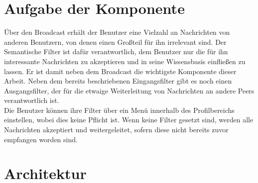\section{Aufgabe der Komponente}
Über den Broadcast erhält der Benutzer eine Vielzahl an Nachrichten von anderen Benutzern, von denen einen Großteil für ihn irrelevant sind. Der Semantische Filter ist dafür verantwortlich, dem Benutzer nur die für ihn interessante Nachrichten zu akzeptieren und in seine Wissensbasis einfließen zu lassen. Er ist damit neben dem Broadcast die wichtigste Komponente dieser Arbeit. Neben dem bereits beschriebenen Eingangsfilter gibt es noch einen Ausgangsfilter, der für die etwaige Weiterleitung von Nachrichten an andere Peers verantwortlich ist. 
\\Die Benutzer können ihre Filter über ein Menü innerhalb des Profilbereichs einstellen, wobei dies keine Pflicht ist. Wenn keine Filter gesetzt sind, werden alle Nachrichten akzeptiert und weitergeleitet, sofern diese nicht bereits zuvor empfangen worden sind. 

\section{Architektur}

